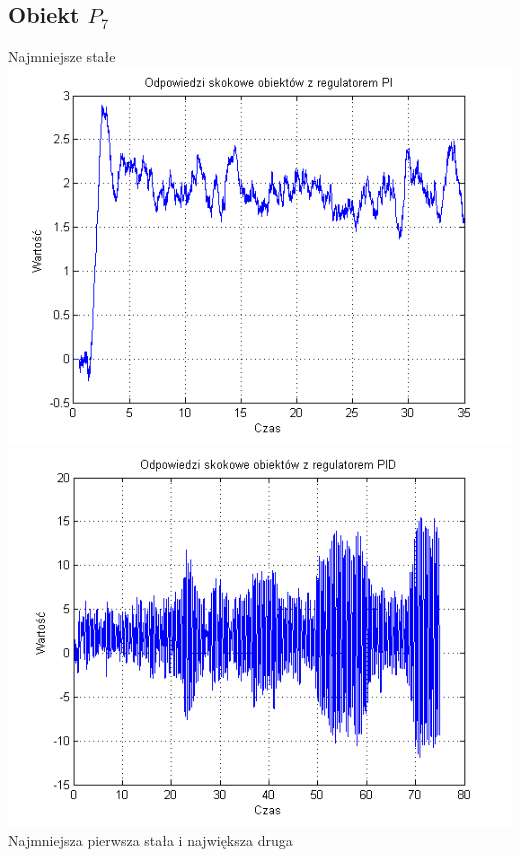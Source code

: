 \documentclass[10pt,a4paper]{article}
\begin{document}
\subsection*{Obiekt $P_7$}
Najmniejsze stałe\\
\includegraphics[scale=1]{images/trzy/skrypt_13.png}\\
\includegraphics[scale=1]{images/cztery/skrypt_13.png}\\
Najmniejsza pierwsza stała i największa druga\\
\end{document}
